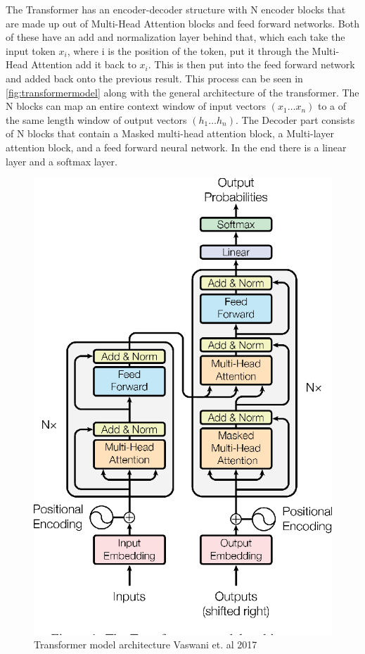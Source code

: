 The Transformer has an encoder-decoder structure with N encoder blocks that are made up out of Multi-Head Attention blocks and feed forward networks. Both of these have an add and normalization layer behind that, which each take the input token $x_i$, where i is the position of the token, put it through the Multi-Head Attention add it back to $x_i$. This is then put into the feed forward network and added back onto the previous result. This process can be seen in \autoref{fig:transformermodel} along with the general architecture of the transformer. 
The N blocks can map an entire context window of input vectors $(x_1\dots x_n)$ to a of the same length window of output vectors $(h_1\dots h_n)$. 
The Decoder part consists of N blocks that contain a Masked multi-head attention block, a Multi-layer attention block, and a feed forward neural network. In the end there is a linear layer and a softmax layer. \cite[chapter~9]{jm3}

\begin{figure}[ht]
        \centering%
        \includegraphics[width=0.5\linewidth]{Latex//sections//images/transformermodel.png}
        \caption{Transformer model architecture Vaswani et. al 2017}
        \label{fig:transformermodel}
    \end{figure}


